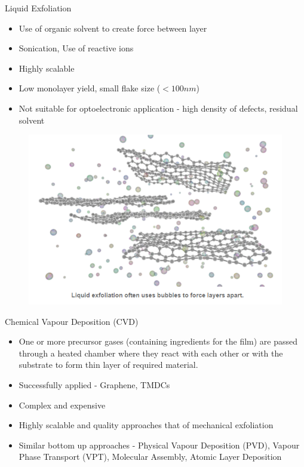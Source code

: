 \documentclass{beamer}
\begin{document}
\begin{frame}{Liquid Exfoliation}
    \begin{itemize}
        \item Use of organic solvent to create force between layer
        \item Sonication, Use of reactive ions
        \item Highly scalable
        \item Low monolayer yield, small flake size ($<100 nm$)
        \item Not suitable for optoelectronic application - high density of defects, residual solvent
    \end{itemize}
    \begin{figure}
        \centering
        \includegraphics[scale = 0.5]{liquid_exfoliation.PNG}
    \end{figure}
\end{frame}

\begin{frame}{Chemical Vapour Deposition (CVD)}
    \begin{itemize}
        \item One or more precursor gases (containing ingredients for the film) are passed through a heated chamber where they react with each other or with the substrate to form thin layer of required material.
        \item Successfully applied - Graphene, TMDCs
        \item Complex and expensive
        \item Highly scalable and quality approaches that of mechanical exfoliation
        \item Similar bottom up approaches - Physical Vapour Deposition (PVD), Vapour Phase Transport (VPT), Molecular Assembly, Atomic Layer Deposition
    \end{itemize}
\end{frame}
\end{document}
